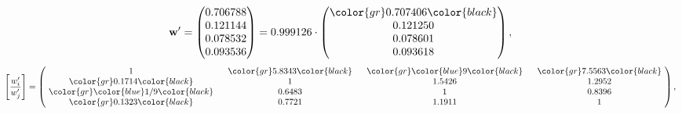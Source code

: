 \begin{example}
\begin{equation*}
\mathbf{w}^{\prime} =
\begin{pmatrix}
0.706788\\
0.121144\\
0.078532\\
0.093536
\end{pmatrix} =
0.999126\cdot
\begin{pmatrix}
\color{gr} 0.707406\color{black} \\
0.121250\\
0.078601\\
0.093618
\end{pmatrix},
\end{equation*}
\begin{equation*}
\left[ \frac{{w}^{\prime}_i}{{w}^{\prime}_j} \right] =
\begin{pmatrix}
$\,\,$ 1 $\,\,$ & $\,\,$\color{gr} 5.8343\color{black} $\,\,$ & $\,\,$\color{gr} \color{blue} 9\color{black} $\,\,$ & $\,\,$\color{gr} 7.5563\color{black} $\,\,$ \\
$\,\,$\color{gr} 0.1714\color{black} $\,\,$ & $\,\,$ 1 $\,\,$ & $\,\,$1.5426$\,\,$ & $\,\,$1.2952  $\,\,$ \\
$\,\,$\color{gr} \color{blue}  1/9\color{black} $\,\,$ & $\,\,$0.6483$\,\,$ & $\,\,$ 1 $\,\,$ & $\,\,$0.8396 $\,\,$ \\
$\,\,$\color{gr} 0.1323\color{black} $\,\,$ & $\,\,$0.7721$\,\,$ & $\,\,$1.1911$\,\,$ & $\,\,$ 1  $\,\,$ \\
\end{pmatrix},
\end{equation*}
\end{example}
\newpage

